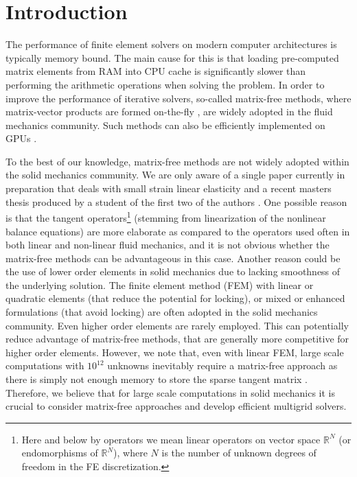\documentclass[preprint,12pt,times]{elsarticle}
\begin{document}
\section{Introduction}

The performance of finite element solvers on modern computer architectures is typically memory bound.
The main cause for this is that loading pre-computed matrix elements from RAM into CPU cache is significantly slower than performing the arithmetic operations when solving the problem.
In order to improve the performance of iterative solvers, so-called matrix-free methods,
where matrix-vector products are formed on-the-fly \cite{kronbichler12,May2015, Krank2017, Brown2010, Gmeiner2016},
are widely adopted in the fluid mechanics community.
Such methods can also be efficiently implemented on GPUs \cite{Abdelfattah2016, ljungkvist2017multigrid}.

To the best of our knowledge, matrix-free methods are not widely adopted within the solid mechanics community.
We are only aware of a single paper currently in preparation that deals with small strain linear elasticity \cite{Clevenger2018} and a recent masters thesis produced by a student of the first two of the authors \cite{Mentler2017}.
One possible reason is that the tangent operators\footnote{{\color{red}Here and
below by operators we mean linear operators on vector space $\mathbb R^N$ (or  endomorphisms of $\mathbb R^N$), where $N$ is the number of unknown degrees of freedom in the FE discretization.}} (stemming from linearization of the nonlinear balance equations) are
more elaborate as compared to the operators used often in both linear and non-linear fluid mechanics, and it is not obvious whether the matrix-free methods can be advantageous in this case.
Another reason could be the use of lower order elements in solid mechanics due to lacking smoothness of the underlying solution.
The finite element method (FEM) with linear or quadratic elements (that reduce the potential for locking), or mixed or enhanced formulations (that avoid locking) are often adopted in the solid mechanics community.
Even higher order elements are rarely employed.
{\color{red}
This can potentially reduce advantage of matrix-free methods, that are generally more competitive for higher order elements.
}
However, we note that, even with linear FEM, large scale computations with $10^{12}$ unknowns inevitably require a matrix-free approach as there is simply not enough memory to store the sparse tangent matrix \cite{Gmeiner2016}. Therefore, we believe that for large scale computations in solid mechanics it is crucial to consider matrix-free approaches and develop efficient multigrid solvers.
\end{document}
